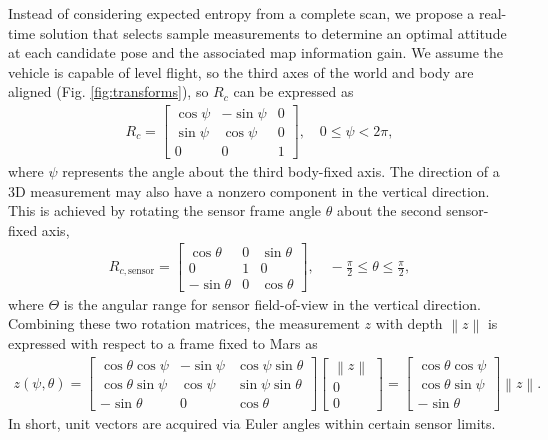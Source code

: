 \documentclass[conf]{new-aiaa}
\newcommand{\norm}[1]{\ensuremath{\left\| #1 \right\|}}
\begin{document}
Instead of considering expected entropy from a complete scan, we propose a real-time solution that selects sample measurements to determine an optimal attitude at each candidate pose and the associated map information gain. We assume the vehicle is capable of level flight, so the third axes of the world and body are aligned (Fig. \ref{fig:transforms}), so $R_c$ can be expressed as
\begin{align*}
R_c=\begin{bmatrix}
\cos\psi & -\sin\psi & 0
\\
\sin\psi & \cos\psi & 0
\\
0 & 0 & 1
\end{bmatrix}, \quad 0\leq\psi<2\pi,
\end{align*}
where $\psi$ represents the angle about the third body-fixed axis. The direction of a 3D measurement may also have a nonzero component in the vertical direction. This is achieved by rotating the sensor frame angle $\theta$ about the second sensor-fixed axis,
\begin{align*}
R_{c,\text{sensor}}=\begin{bmatrix}
\cos\theta & 0 & \sin\theta
\\
0 & 1 & 0
\\
-\sin\theta & 0 & \cos\theta
\end{bmatrix}, \quad -\frac{\pi}{2}\leq\theta\leq\frac{\pi}{2},
\end{align*}
where $\Theta$ is the angular range for sensor field-of-view in the vertical direction. Combining these two rotation matrices, the measurement $z$ with depth $\norm{z}$ is expressed with respect to a frame fixed to Mars as
\begin{align}
z(\psi,\theta)=\begin{bmatrix}\cos\theta\cos\psi & -\sin\psi & \cos\psi\sin\theta
\\
\cos\theta\sin\psi & \cos\psi & \sin\psi\sin\theta
\\
-\sin\theta & 0 & \cos\theta
\end{bmatrix}
\begin{bmatrix}
\norm{z} \\ 0 \\ 0
\end{bmatrix}
=
\begin{bmatrix}
\cos\theta\cos\psi
\\
\cos\theta\sin\psi
\\
-\sin\theta
\end{bmatrix}\norm{z}.
\end{align}
In short, unit vectors are acquired via Euler angles within certain sensor limits.
\end{document}
